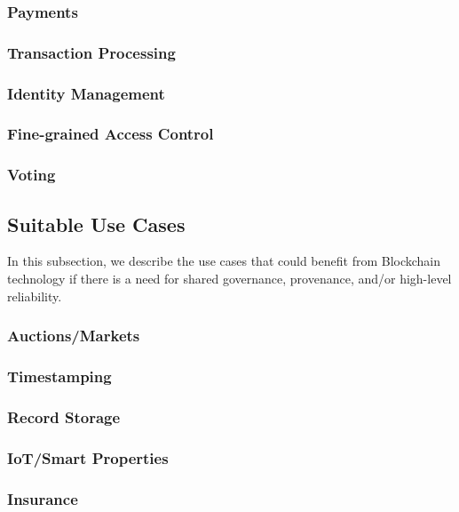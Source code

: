 \subsubsection{Payments}

\subsubsection{Transaction Processing}

\subsubsection{Identity Management}

\subsubsection{Fine-grained Access Control}

\subsubsection{Voting}

\subsection{Suitable Use Cases}
In this subsection, we describe the use cases that could benefit from Blockchain technology if there is a need for shared governance, provenance, and/or high-level reliability.

\subsubsection{Auctions/Markets}

\subsubsection{Timestamping}

\subsubsection{Record Storage}

\subsubsection{IoT/Smart Properties}

\subsubsection{Insurance}

